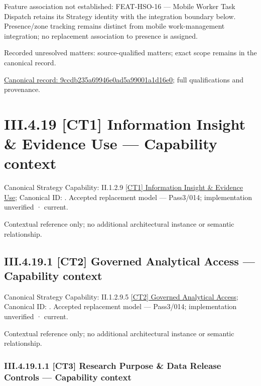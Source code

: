 Feature association not established: FEAT-HSO-16 — Mobile Worker Task Dispatch retains its Strategy identity with the integration boundary below. Presence/zone tracking remains distinct from mobile work-management integration; no replacement association to presence is assigned.


{\small Recorded unresolved matters: source-qualified matters; exact scope remains in the canonical record.}\par
{\footnotesize \href{../../../../../../../../continuum/business/business-function/9ccdb235a69946e0ad5a99001a1d16e0.md}{Canonical record: 9ccdb235a69946e0ad5a99001a1d16e0}; full qualifications and provenance.}\par
\section*{III.4.19 [CT1] Information Insight \& Evidence Use — Capability context}
\label{navigation:III.4.19}

{\small Canonical Strategy Capability: II.1.2.9 \hyperref[element:73b06d3d6f8f4dc0a7f9f7d500c0aed4]{[CT1] Information Insight \& Evidence Use}; Canonical ID: \texttt{}. Accepted replacement model — Pass3/014; implementation unverified · current.}\par
Contextual reference only; no additional architectural instance or semantic relationship.\par
\subsection*{III.4.19.1 [CT2] Governed Analytical Access — Capability context}
\label{navigation:III.4.19.1}

{\small Canonical Strategy Capability: II.1.2.9.5 \hyperref[element:262a67d8e3fc4a4abfc5a014af89479c]{[CT2] Governed Analytical Access}; Canonical ID: \texttt{}. Accepted replacement model — Pass3/014; implementation unverified · current.}\par
Contextual reference only; no additional architectural instance or semantic relationship.\par
\subsubsection*{III.4.19.1.1 [CT3] Research Purpose \& Data Release Controls — Capability context}
\label{navigation:III.4.19.1.1}

